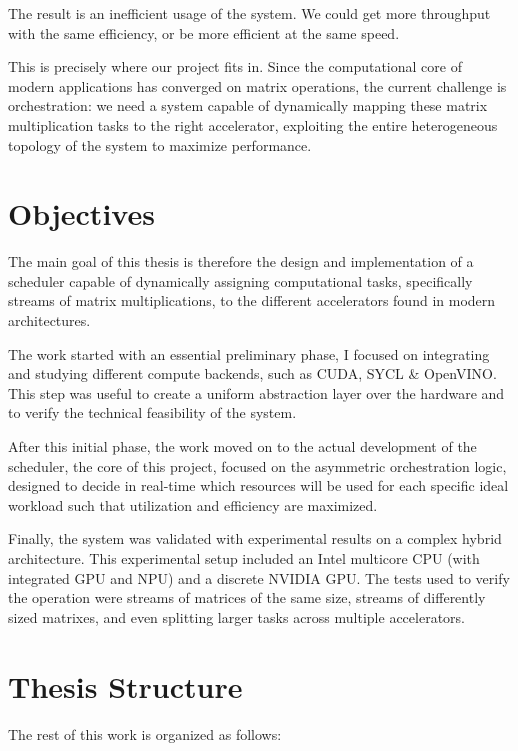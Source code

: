 The result is an inefficient usage of the system. We could get more throughput with the same efficiency, or be more efficient at the same speed. 

This is precisely where our project fits in. Since the computational core of modern applications has converged on matrix operations, the current challenge is orchestration: we need a system capable of dynamically mapping these matrix multiplication tasks to the right accelerator, exploiting the entire heterogeneous topology of the system to maximize performance.

\section{Objectives}
The main goal of this thesis is therefore the design and implementation of a scheduler capable of dynamically assigning computational tasks, specifically streams of matrix multiplications, to the different accelerators found in modern architectures.

The work started with an essential preliminary phase, I focused on integrating and studying different compute backends, such as CUDA, SYCL \& OpenVINO. This step was useful to create a uniform abstraction layer over the hardware and to verify the technical feasibility of the system.

After this initial phase, the work moved on to the actual development of the scheduler, the core of this project, focused on the asymmetric orchestration logic, designed to decide in real-time which resources will be used for each specific ideal workload such that utilization and efficiency are maximized.

Finally, the system was validated with experimental results on a complex hybrid architecture. This experimental setup included an Intel multicore CPU (with integrated GPU and NPU) and a discrete NVIDIA GPU. The tests used to verify the operation were streams of matrices of the same size, streams of differently sized matrixes, and even splitting larger tasks across multiple accelerators.

\clearpage

\section{Thesis Structure}
The rest of this work is organized as follows:

